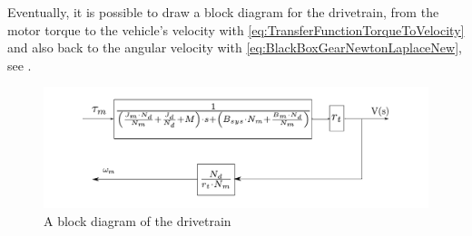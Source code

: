 Eventually, it is possible to draw a block diagram for the drivetrain, from the motor torque to the vehicle's velocity with \eqref{eq:TransferFunctionTorqueToVelocity} and also back to the angular velocity with \eqref{eq:BlackBoxGearNewtonLaplaceNew}, see .

\begin{figure}[H]
	\centering
	\includegraphics[scale=0.8]{figures/blockDiagramDrivetrain.pdf}
	\caption{A block diagram of the drivetrain}
	\label{fig:BlockDiagramDrivetrain}
\end{figure}
